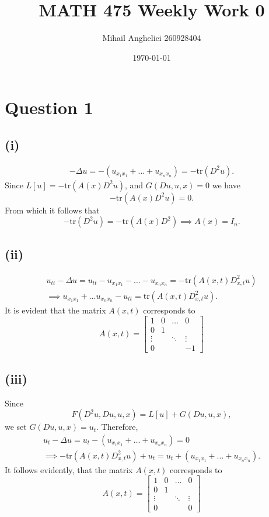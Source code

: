 \documentclass[
	12pt,
	]{article}
\title{MATH 475 Weekly Work 0}
\author{Mihail Anghelici 260928404 }
\date{\today}
\theoremstyle{definition}
\theoremstyle{definition}
\theoremstyle{definition}
\theoremstyle{definition}
\theoremstyle{definition}
\theoremstyle{example}
\theoremstyle{note}
\theoremstyle{remark}
\theoremstyle{example}
\begin{document}
	\maketitle
		\section*{Question 1 }
			\subsection*{(i)}
				\begin{align*}
					-\Delta u = - (u_{x_{1}x_{1}} + \dots + u_{x_{n}x_{n}}) = -\text{tr}(D^{2}u).
				\end{align*}
				Since $L[u] = -\text{tr}(A(x)D^{2}u)$, and $G(Du, u ,x) = 0$ we have 
				$$ -\text{tr}(A(x)D^{2}u) = 0.$$ From which it follows that 
				$$ -\text{tr}(D^{2}u) = -\text{tr}(A(x)D^{2}) \implies A(x) = I_{n}.$$ 
			\subsection*{(ii)}
				\begin{gather*}
					u_{tt} - \Delta u = u_{tt} - u_{x_{1}x_{1}} - \dots - u_{x_{n}x_{n}} = -\text{tr}(A(x,t)D^{2}_{x,t} u) \\
					\implies  u_{x_{1}x_{1}} + \dots u_{x_{n}x_{n}} - u_{tt} = \text{tr}(A(x,t)D^{2}_{x,t}u).
				\end{gather*}
				It is evident that the matrix $A(x,t)$ corresponds to 
				$$ A(x,t) = 
				\begin{bmatrix}
				1 & 0 & \dots & 0 \\
				0 & 1 & & \\
				\vdots & & \ddots & \vdots \\
				0 & & & -1	
				\end{bmatrix}$$
			\subsection*{(iii)}
				Since $$ F(D^{2}u , Du, u ,x) = L[u] + G(Du, u ,x),$$
				we set $G(Du,u,x) = u_t$. Therefore, 
				\begin{gather*}
					u_t - \Delta u = u_{t} - (u_{x_{1}x_{1}} + \dots + u_{x_{n}x_{n}}) = 0 \\
					\implies -\text{tr}(A(x,t)D^{2}_{x,t}u) + u_t = u_{t} +  (u_{x_{1}x_{1}} + \dots + u_{x_{n}x_{n}}).
				\end{gather*}
				It follows evidently, that the matrix $A(x,t)$ corresponds to 
				$$ A(x,t) = 
				\begin{bmatrix}
				1 & 0 & \dots & 0 \\
				0 & 1 & & \\
				\vdots & & \ddots & \vdots \\
				0 & & & 0	
				\end{bmatrix}$$	
\end{document}
